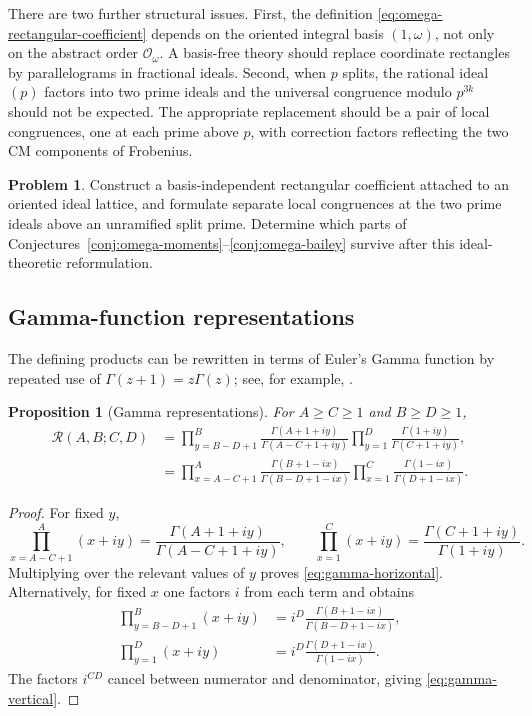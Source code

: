 \documentclass[a4paper,american,11pt]{amsart}
\numberwithin{equation}{section}
\newtheorem{proposition}[theorem]{Proposition}
\theoremstyle{definition}
\newtheorem{problem}[theorem]{Problem}
\newcommand{\Rect}{\mathcal R}
\begin{document}
There are two further structural issues.  First, the definition
\eqref{eq:omega-rectangular-coefficient} depends on the oriented integral basis
$(1,\omega)$, not only on the abstract order $\mathcal O_\omega$.  A basis-free theory
should replace coordinate rectangles by parallelograms in fractional ideals.  Second,
when $p$ splits, the rational ideal $(p)$ factors into two prime ideals and the universal
congruence modulo $p^{3k}$ should not be expected.  The appropriate replacement should
be a pair of local congruences, one at each prime above $p$, with correction factors
reflecting the two CM components of Frobenius.

\begin{problem}\label{prob:omega-ideal-formulation}
Construct a basis-independent rectangular coefficient attached to an oriented ideal
lattice, and formulate separate local congruences at the two prime ideals above an
unramified split prime.  Determine which parts of Conjectures~\ref{conj:omega-moments}--\ref{conj:omega-bailey} survive after this ideal-theoretic reformulation.
\end{problem}




\subsection{Gamma-function representations}
The defining products can be rewritten in terms of Euler's Gamma function by repeated use of
$\Gamma(z+1)=z\Gamma(z)$; see, for example, \cite[Chapter~1]{AndrewsAskeyRoy1999}.

\begin{proposition}[Gamma representations]\label{prop:gamma-representations}
For $A\geq C\geq1$ and $B\geq D\geq1$,
\begin{align}
\Rect(A,B;C,D)
&=
\prod_{y=B-D+1}^{B}
\frac{\Gamma(A+1+iy)}{\Gamma(A-C+1+iy)}
\prod_{y=1}^{D}
\frac{\Gamma(1+iy)}{\Gamma(C+1+iy)},
\label{eq:gamma-horizontal}\\
&=
\prod_{x=A-C+1}^{A}
\frac{\Gamma(B+1-ix)}{\Gamma(B-D+1-ix)}
\prod_{x=1}^{C}
\frac{\Gamma(1-ix)}{\Gamma(D+1-ix)}.
\label{eq:gamma-vertical}
\end{align}
\end{proposition}

\begin{proof}
For fixed $y$,
\[
\prod_{x=A-C+1}^{A}(x+iy)
=
\frac{\Gamma(A+1+iy)}{\Gamma(A-C+1+iy)},
\qquad
\prod_{x=1}^{C}(x+iy)
=
\frac{\Gamma(C+1+iy)}{\Gamma(1+iy)}.
\]
Multiplying over the relevant values of $y$ proves \eqref{eq:gamma-horizontal}. Alternatively, for fixed $x$ one factors $i$ from each term and obtains
\begin{align*}
\prod_{y=B-D+1}^{B}(x+iy)
&=
i^D\frac{\Gamma(B+1-ix)}{\Gamma(B-D+1-ix)},\\
\prod_{y=1}^{D}(x+iy)
&=
i^D\frac{\Gamma(D+1-ix)}{\Gamma(1-ix)}.
\end{align*}
The factors $i^{CD}$ cancel between numerator and denominator, giving \eqref{eq:gamma-vertical}.
\end{proof}
\end{document}
